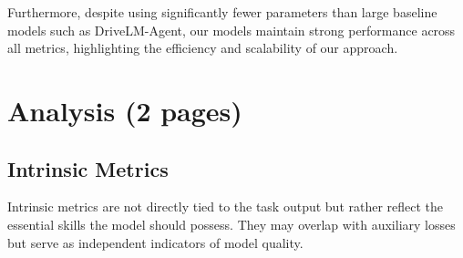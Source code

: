 \documentclass{article} %
\begin{document}
Furthermore, despite using significantly fewer parameters than large baseline models such as DriveLM-Agent, our models maintain strong performance across all metrics, highlighting the efficiency and scalability of our approach.

\begin{table}[H]
\centering
{}
\caption{Comparison of Our Methods with Baseline Models on DriveLM-nuScenes.}
\label{tab:results}
\end{table}

\clearpage
\section{ Analysis (2 pages)}

\subsection{Intrinsic Metrics}
Intrinsic metrics are not directly tied to the task output but rather reflect the essential skills the model should possess. They may overlap with auxiliary losses but serve as independent indicators of model quality.
\end{document}
